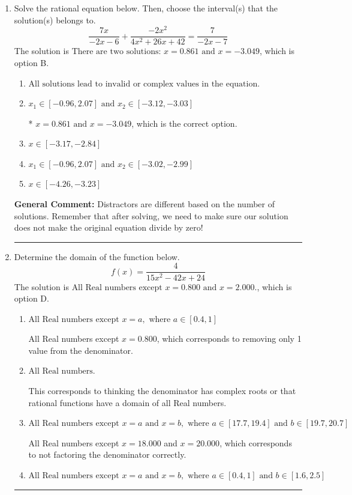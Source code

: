 \documentclass{extbook}[14pt]
\newcommand{\litem}[1]{\item #1

\rule{\textwidth}{0.4pt}}
\begin{document}
\begin{enumerate}\litem{
Solve the rational equation below. Then, choose the interval(s) that the solution(s) belongs to.
\[ \frac{7x}{-2x -6} + \frac{-2x^{2}}{4x^{2} +26 x + 42} = \frac{7}{-2x -7} \]The solution is \( \text{There are two solutions: } x = 0.861 \text{ and } x = -3.049 \), which is option B.\begin{enumerate}[label=\Alph*.]
\item \( \text{All solutions lead to invalid or complex values in the equation.} \)


\item \( x_1 \in [-0.96, 2.07] \text{ and } x_2 \in [-3.12,-3.03] \)

* $x = 0.861 \text{ and } x = -3.049$, which is the correct option.
\item \( x \in [-3.17,-2.84] \)


\item \( x_1 \in [-0.96, 2.07] \text{ and } x_2 \in [-3.02,-2.99] \)


\item \( x \in [-4.26,-3.23] \)


\end{enumerate}

\textbf{General Comment:} Distractors are different based on the number of solutions. Remember that after solving, we need to make sure our solution does not make the original equation divide by zero!
}
\litem{
Determine the domain of the function below.
\[ f(x) = \frac{4}{15x^{2} -42 x + 24} \]The solution is \( \text{All Real numbers except } x = 0.800 \text{ and } x = 2.000. \), which is option D.\begin{enumerate}[label=\Alph*.]
\item \( \text{All Real numbers except } x = a, \text{ where } a \in [0.4, 1] \)

All Real numbers except $x = 0.800$, which corresponds to removing only 1 value from the denominator.
\item \( \text{All Real numbers.} \)

This corresponds to thinking the denominator has complex roots or that rational functions have a domain of all Real numbers.
\item \( \text{All Real numbers except } x = a \text{ and } x = b, \text{ where } a \in [17.7, 19.4] \text{ and } b \in [19.7, 20.7] \)

All Real numbers except $x = 18.000$ and $x = 20.000$, which corresponds to not factoring the denominator correctly.
\item \( \text{All Real numbers except } x = a \text{ and } x = b, \text{ where } a \in [0.4, 1] \text{ and } b \in [1.6, 2.5] \)


\end{enumerate}}
\end{enumerate}
\end{document}
